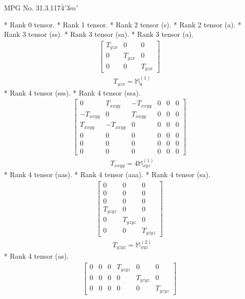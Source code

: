 \documentclass[fleqn,8pt,landscape]{jsarticle}
\begin{document}
\setcounter{MaxMatrixCols}{32}

\renewcommand{\tablename}{Table~}
\renewcommand{\figurename}{Figure~}
\begin{center}
\LARGE
MPG No. 31.3.117\quad$\bar{4}'3m'$
\end{center}
* Rank 0 tensor.
* Rank 1 tensor.
* Rank 2 tensor (s).
* Rank 2 tensor (a).
* Rank 3 tensor (ss).
* Rank 3 tensor (sa).
* Rank 3 tensor (a).
\begin{align*}
\begin{bmatrix} T_{yzx} & 0 & 0 \\ 0 & T_{yzx} & 0 \\ 0 & 0 & T_{yzx} \end{bmatrix}
\end{align*}
\begin{align*}
& T_{yzx} = \mathbb{M}_{0}^{(1)}
\end{align*}
* Rank 4 tensor (sss).
* Rank 4 tensor (ssa).
\begin{align*}
\begin{bmatrix} 0 & T_{xxyy} & - T_{xxyy} & 0 & 0 & 0 \\ - T_{xxyy} & 0 & T_{xxyy} & 0 & 0 & 0 \\ T_{xxyy} & - T_{xxyy} & 0 & 0 & 0 & 0 \\ 0 & 0 & 0 & 0 & 0 & 0 \\ 0 & 0 & 0 & 0 & 0 & 0 \\ 0 & 0 & 0 & 0 & 0 & 0 \end{bmatrix}
\end{align*}
\begin{align*}
& T_{xxyy} = 4 \mathbb{M}_{xyz}^{(1)}
\end{align*}
* Rank 4 tensor (aas).
* Rank 4 tensor (aaa).
* Rank 4 tensor (sa).
\begin{align*}
\begin{bmatrix} 0 & 0 & 0 \\ 0 & 0 & 0 \\ 0 & 0 & 0 \\ T_{yzyz} & 0 & 0 \\ 0 & T_{yzyz} & 0 \\ 0 & 0 & T_{yzyz} \end{bmatrix}
\end{align*}
\begin{align*}
& T_{yzyz} = \mathbb{M}_{xyz}^{(2)}
\end{align*}
* Rank 4 tensor (as).
\begin{align*}
\begin{bmatrix} 0 & 0 & 0 & T_{yzyz} & 0 & 0 \\ 0 & 0 & 0 & 0 & T_{yzyz} & 0 \\ 0 & 0 & 0 & 0 & 0 & T_{yzyz} \end{bmatrix}
\end{align*}
\end{document}
